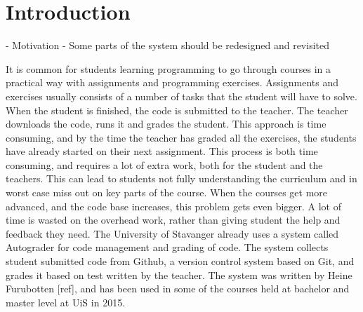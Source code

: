 

%
\maketitle
\chapter{Introduction}

- Motivation
- Some parts of the system should be redesigned and revisited


It is common for students learning programming to go through courses in a practical way with assignments and programming exercises. Assignments and exercises usually consists of a number of tasks that the student will have to solve. When the student is finished, the code is submitted to the teacher. The teacher downloads the code, runs it and grades the student. This approach is time consuming, and by the time the teacher has graded all the exercises, the students have already started on their next assignment. This process is both time consuming, and requires a lot of extra work, both for the student and the teachers. This can lead to students not fully understanding the curriculum and in worst case miss out on key parts of the course. When the courses get more advanced, and the code base increases, this problem gets even bigger. A lot of time is wasted on the overhead work, rather than giving student the help and feedback they need. The University of Stavanger already uses a system called Autograder for code management and grading of code. The system collects student submitted code from Github, a version control system based on Git, and grades it based on test written by the teacher. The system was written by Heine Furubotten [ref], and has been used in some of the courses held at bachelor and master level at UiS in 2015.

